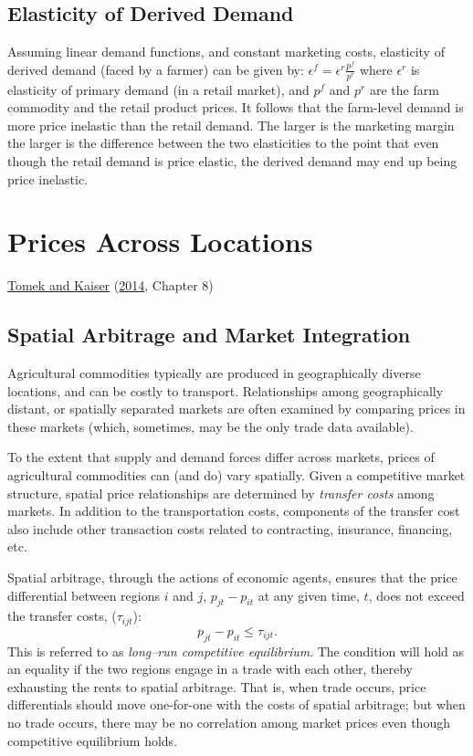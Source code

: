 \documentclass[
  oneside]{book}
\begin{document}
\hypertarget{elasticity-of-derived-demand}{%
\section{Elasticity of Derived Demand}\label{elasticity-of-derived-demand}}

Assuming linear demand functions, and constant marketing costs, elasticity of derived demand (faced by a farmer) can be given by: \(\epsilon^f = \epsilon^r\frac{p^f}{p^r}\) where \(\epsilon^r\) is elasticity of primary demand (in a retail market), and \(p^f\) and \(p^r\) are the farm commodity and the retail product prices. It follows that the farm-level demand is more price inelastic than the retail demand. The larger is the marketing margin the larger is the difference between the two elasticities to the point that even though the retail demand is price elastic, the derived demand may end up being price inelastic.

\hypertarget{prices-across-locations}{%
\chapter{Prices Across Locations}\label{prices-across-locations}}

\protect\hyperlink{ref-tomek2014}{Tomek and Kaiser} (\protect\hyperlink{ref-tomek2014}{2014}, Chapter 8)

\hypertarget{spatial-arbitrage-and-market-integration}{%
\section{Spatial Arbitrage and Market Integration}\label{spatial-arbitrage-and-market-integration}}

Agricultural commodities typically are produced in geographically diverse locations, and can be costly to transport. Relationships among geographically distant, or spatially separated markets are often examined by comparing prices in these markets (which, sometimes, may be the only trade data available).

To the extent that supply and demand forces differ across markets, prices of agricultural commodities can (and do) vary spatially. Given a competitive market structure, spatial price relationships are determined by \emph{transfer costs} among markets. In addition to the transportation costs, components of the transfer cost also include other transaction costs related to contracting, insurance, financing, etc.

Spatial arbitrage, through the actions of economic agents, ensures that the price differential between regions \(i\) and \(j\), \(p_{jt}-p_{it}\) at any given time, \(t\), does not exceed the transfer costs, (\(\tau_{ijt}\)): \[p_{jt}-p_{it} \le \tau_{ijt}.\] This is referred to as \emph{long--run competitive equilibrium}. The condition will hold as an equality if the two regions engage in a trade with each other, thereby exhausting the rents to spatial arbitrage. That is, when trade occurs, price differentials should move one-for-one with the costs of spatial arbitrage; but when no trade occurs, there may be no correlation among market prices even though competitive equilibrium holds.
\end{document}
